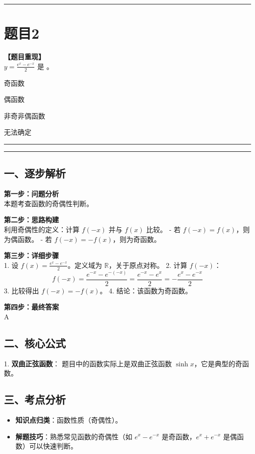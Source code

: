 \documentclass[12pt, a4paper]{ctexart}
\newcommand{\TopSeparator}{
    \par\noindent\rule{\textwidth}{1.5pt}\vspace{0.5em} %
}
\newcommand{\AnalysisSeparator}{
    \par\noindent\rule{\textwidth}{0.5pt}\vspace{0.2em}\hrule\vspace{0.5em} %
}
\newenvironment{RedAnalysis}{
    \par
    \color{red} %
}{
    \par
    \color{black} %
}
\newcommand{\choicesFour}[4]{
    \begin{enumerate}[label=\Alph*., itemsep=0pt, parsep=0pt, topsep=5pt, labelsep=0.5em]
        \begin{minipage}{0.22\linewidth} \item #1 \end{minipage}
        \begin{minipage}{0.22\linewidth} \item #2 \end{minipage}
        \begin{minipage}{0.22\linewidth} \item #3 \end{minipage}
        \begin{minipage}{0.22\linewidth} \item #4 \end{minipage}
    \end{enumerate}
}
\begin{document}
\TopSeparator
\section*{题目2}

\textbf{【题目重现】} \\
$ y = \frac{e^{x} - e^{-x}}{2} $ 是 \underline{\hspace{1cm}}。
\choicesFour{奇函数}{偶函数}{非奇非偶函数}{无法确定}

\AnalysisSeparator

\begin{RedAnalysis}

\subsection*{一、逐步解析}

\textbf{第一步：问题分析} \\
本题考查函数的奇偶性判断。

\textbf{第二步：思路构建} \\
利用奇偶性的定义：计算 $f(-x)$ 并与 $f(x)$ 比较。
- 若 $f(-x) = f(x)$，则为偶函数。
- 若 $f(-x) = -f(x)$，则为奇函数。

\textbf{第三步：详细步骤} \\
1. 设 $f(x) = \frac{e^{x} - e^{-x}}{2}$。定义域为 $\mathbb{R}$，关于原点对称。
2. 计算 $f(-x)$：
   \[ f(-x) = \frac{e^{-x} - e^{-(-x)}}{2} = \frac{e^{-x} - e^{x}}{2} = -\frac{e^{x} - e^{-x}}{2} \]
3. 比较得出 $f(-x) = -f(x)$。
4. 结论：该函数为奇函数。

\textbf{第四步：最终答案} \\
A

\subsection*{二、核心公式}
1. \textbf{双曲正弦函数}：
   题目中的函数实际上是双曲正弦函数 $\sinh x$，它是典型的奇函数。

\subsection*{三、考点分析}
\begin{itemize}
    \item \textbf{知识点归类}：函数性质（奇偶性）。
    \item \textbf{解题技巧}：熟悉常见函数的奇偶性（如 $e^x - e^{-x}$ 是奇函数，$e^x + e^{-x}$ 是偶函数）可以快速判断。
\end{itemize}

\end{RedAnalysis}
\end{document}
